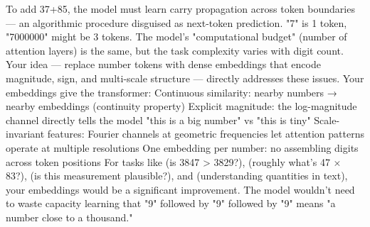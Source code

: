 \markdownRendererUlItem {} To add 37+85, the model must learn carry propagation across token boundaries — an algorithmic procedure disguised as next-token prediction.\markdownRendererUlItemEnd 
\markdownRendererUlItem {} "7" is 1 token, "7000000" might be 3 tokens. The model's "computational budget" (number of attention layers) is the same, but the task complexity varies with digit count.\markdownRendererUlItemEnd 
\markdownRendererUlEndTight \markdownRendererInterblockSeparator
{}Your idea — replace number tokens with dense embeddings that encode magnitude, sign, and multi-scale structure — directly addresses these issues.\markdownRendererInterblockSeparator
{}
\markdownRendererSectionEnd \markdownRendererSectionBegin
{}\markdownRendererInterblockSeparator
{} Your embeddings give the transformer:\markdownRendererInterblockSeparator
{}\markdownRendererUlBeginTight
\markdownRendererUlItem Continuous similarity: nearby numbers → nearby embeddings (continuity property)\markdownRendererUlItemEnd 
\markdownRendererUlItem Explicit magnitude: the log-magnitude channel directly tells the model "this is a big number" vs "this is tiny"\markdownRendererUlItemEnd 
\markdownRendererUlItem Scale-invariant features: Fourier channels at geometric frequencies let attention patterns operate at multiple resolutions\markdownRendererUlItemEnd 
\markdownRendererUlItem One embedding per number: no assembling digits across token positions\markdownRendererUlItemEnd 
\markdownRendererUlEndTight \markdownRendererInterblockSeparator
{}For tasks like  (is 3847 > 3829?),  (roughly what's 47 × 83?),  (is this measurement plausible?), and  (understanding quantities in text), your embeddings would be a significant improvement. The model wouldn't need to waste capacity learning that "9" followed by "9" followed by "9" means "a number close to a thousand."\markdownRendererInterblockSeparator
{}
\markdownRendererSectionEnd \markdownRendererSectionBegin
{}\markdownRendererInterblockSeparator
{}\markdownRendererSectionBegin
{}\markdownRendererInterblockSeparator
